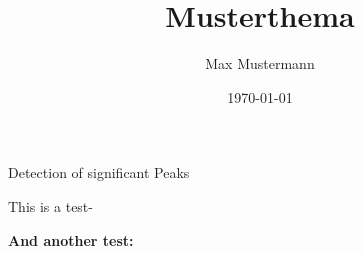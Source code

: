 \documentclass[t,8pt]{beamer}
\title[Musterthema]{Musterthema}
\author{Max Mustermann}
\date{\today}
\institute{Musteruni}
\begin{document}


\begin{dwHeaderFrame}{Detection of significant Peaks}
	\begin{dwItemize}
		\item This is a test-
		\item \textbf{And another test:}
	\end{dwItemize}

\end{dwHeaderFrame}


\begin{dwFrame}

\end{dwFrame}
\end{document}
